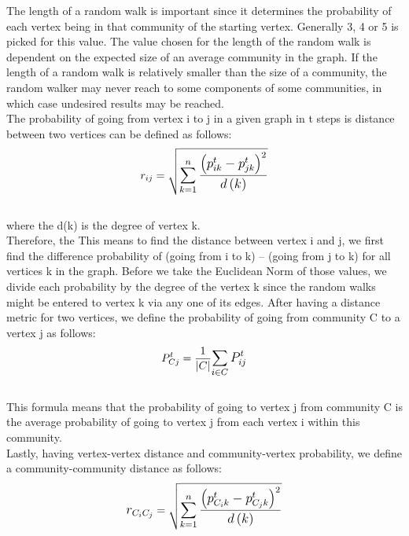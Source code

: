 \documentclass[10pt]{article}
\begin{document}
The length of a random walk is important since it determines the probability of each vertex being in that community of the starting vertex. Generally 3, 4 or 5 is picked for this value. The value chosen for the length of the random walk is dependent on the expected size of an average community in the graph. If the length of a random walk is relatively smaller than the size of a community, the random walker may never reach to some components of some communities, in which case undesired results may be reached. \\

The probability of going from vertex i to j in a given graph in t steps is distance between two vertices can be defined as follows: \\

\[ r_{ij} = \sqrt{ \mathlarger { \sum_{k=1}^{n} \frac{ \left( p_{ik}^{t} - p_{jk}^{t} \right)^{2} }{d\left( k \right) } } } \] \\

where the d(k) is the degree of vertex k. \\

Therefore, the
  This means to find the distance between vertex i and j, we first find the difference probability of (going from i to k) – (going from j to k) for all vertices k in the graph. Before we take the Euclidean Norm of those values, we divide each probability by the degree of the vertex k since the random walks might be entered to vertex k via any one of its edges.
After having a distance metric for two vertices, we define the probability of going from community C to a vertex j as follows: \\

\[ P_{Cj}^{t} = \frac{1}{|C|}  \mathlarger{ \sum_{i \in C} P_{ij}^{t} }  \] \\

This formula means that the probability of going to vertex j from community C is the average probability of going to vertex j from each vertex i within this community. \\

Lastly, having vertex-vertex distance and community-vertex probability, we define a community-community distance as follows: \\

\[ \mathlarger{ r_{C_{i}C_{j}} } = \sqrt{ \mathlarger { \sum_{k=1}^{n} \frac{ \left( p_{C_{i}k}^{t} - p_{C_{j}k}^{t} \right)^{2} }{d\left( k \right) } } } \] \\
\end{document}
